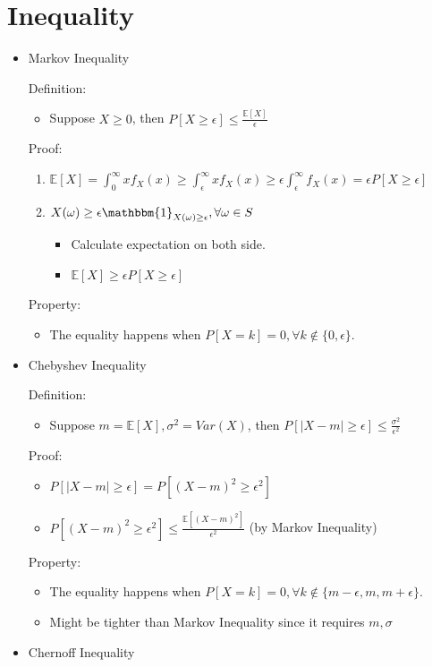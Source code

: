 \documentclass[a4paper]{article}
\begin{document}
\section{Inequality}
\begin{itemize}
    \item Markov Inequality

        Definition:
        \begin{itemize}
            \item Suppose $X \geq 0$, then $P[X \geq \epsilon] \leq \frac{\mathbb{E}[X]}{\epsilon}$
        \end{itemize}

        Proof:
        \begin{enumerate}
            \item $\mathbb{E}[X] = \int_0^\infty x f_X(x) \geq \int_\epsilon^\infty x f_X(x) \geq \epsilon \int_\epsilon^\infty f_X(x) = \epsilon P[X \geq \epsilon]$
            \item $X(\omega) \geq \epsilon \mathbbm{1}_{X(\omega) \geq \epsilon}, \forall \omega \in S$
                \begin{itemize}
                    \item Calculate expectation on both side.
                    \item $\mathbb{E}[X] \geq \epsilon P[X \geq \epsilon]$
                \end{itemize}
        \end{enumerate}
        Property:
        \begin{itemize}
            \item The equality happens when $P[X=k] = 0, \forall k \not \in \{0, \epsilon\}$.
        \end{itemize}
    \item Chebyshev Inequality

        Definition:
        \begin{itemize}
            \item Suppose $m = \mathbb{E}[X], \sigma^2 = \mathit{Var}(X)$, then $P[|X - m| \geq \epsilon] \leq \frac{\sigma^2}{\epsilon^2}$
        \end{itemize}
        Proof:
        \begin{itemize}
            \item $P[|X - m| \geq \epsilon] = P[(X - m)^2 \geq \epsilon^2]$
            \item $P[(X - m)^2 \geq \epsilon^2] \leq \frac{\mathbb{E}[(X-m)^2]}{\epsilon^2}$ (by Markov Inequality)
        \end{itemize}
        Property:
        \begin{itemize}
            \item The equality happens when $P[X = k] = 0, \forall k \not \in \{m - \epsilon , m , m + \epsilon\}$.
            \item Might be tighter than Markov Inequality since it requires $m, \sigma$
        \end{itemize}
    \item Chernoff Inequality


\end{itemize}
\end{document}
